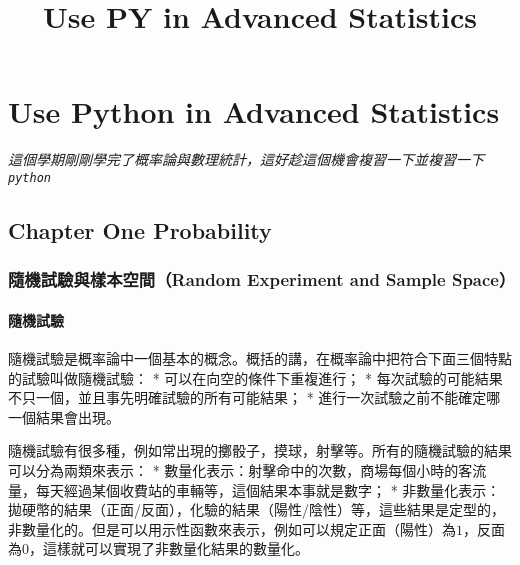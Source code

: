 \documentclass[11pt]{article}
\title{Use PY in Advanced Statistics }
\begin{document}
    
    
    \maketitle
    
    

    
    \hypertarget{use-python-in-advanced-statistics}{%
\section{Use Python in Advanced
Statistics}\label{use-python-in-advanced-statistics}}

\emph{這個學期剛剛學完了概率論與數理統計，這好趁這個機會複習一下並複習一下
\texttt{python}} 

    \hypertarget{chapter-one-probability}{%
\subsection{Chapter One Probability}\label{chapter-one-probability}}

\hypertarget{ux96a8ux6a5fux8a66ux9a57ux8207ux6a23ux672cux7a7aux9593random-experiment-and-sample-space}{%
\subsubsection{隨機試驗與樣本空間（Random Experiment and Sample
Space）}\label{ux96a8ux6a5fux8a66ux9a57ux8207ux6a23ux672cux7a7aux9593random-experiment-and-sample-space}}

\hypertarget{ux96a8ux6a5fux8a66ux9a57}{%
\paragraph{隨機試驗}\label{ux96a8ux6a5fux8a66ux9a57}}

隨機試驗是概率論中一個基本的概念。概括的講，在概率論中把符合下面三個特點的試驗叫做隨機試驗：
* 可以在向空的條件下重複進行； *
每次試驗的可能結果不只一個，並且事先明確試驗的所有可能結果； *
進行一次試驗之前不能確定哪一個結果會出現。

隨機試驗有很多種，例如常出現的擲骰子，摸球，射擊等。所有的隨機試驗的結果可以分為兩類來表示：
*
數量化表示：射擊命中的次數，商場每個小時的客流量，每天經過某個收費站的車輛等，這個結果本事就是數字；
*
非數量化表示：拋硬幣的結果（正面/反面），化驗的結果（陽性/陰性）等，這些結果是定型的，非數量化的。但是可以用示性函數來表示，例如可以規定正面（陽性）為\(1\)，反面為\(0\)，這樣就可以實現了非數量化結果的數量化。
\end{document}
